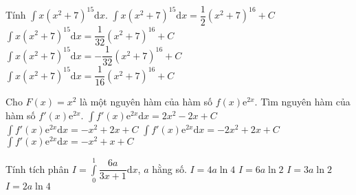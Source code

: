\begin{ex}%
	Tính $\displaystyle \int x(x^2+7)^{15} \mathrm{d}x$.
	\choice
	{$\displaystyle \int x(x^2+7)^{15} \mathrm{d}x=\dfrac{1}{2}{\left(x^2+7\right)}^{16}+C$}
	{\True $\displaystyle \int x(x^2+7)^{15} \mathrm{d}x=\dfrac{1}{32}{\left(x^2+7\right)}^{16}+C$}
	{$\displaystyle \int x(x^2+7)^{15} \mathrm{d}x=-\dfrac{1}{32}{\left(x^2+7\right)}^{16}+C$}
	{$\displaystyle \int x(x^2+7)^{15} \mathrm{d}x=\dfrac{1}{16}{\left(x^2+7\right)}^{16}+C$}
\end{ex}
\begin{ex}%
	Cho $F(x)=x^2$ là một nguyên hàm của hàm số $f(x)\mathrm{e}^{2x}$. Tìm nguyên hàm của hàm số $f'(x)\mathrm{e}^{2x}$.
	\choice
	{$\displaystyle \int f'(x)\mathrm{e}^{2x}\mathrm{d}x=2x^2-2x+C$}
{ $\displaystyle \int f'(x)\mathrm{e}^{2x}\mathrm{d}x=-x^2+2x+C$}
{\True $\displaystyle \int f'(x)\mathrm{e}^{2x}\mathrm{d}x=-2x^2+2x+C$}
{$\displaystyle \int f'(x)\mathrm{e}^{2x}\mathrm{d}x=-x^2+x+C$}
\end{ex}
\begin{ex}%
Tính tích phân $I=\displaystyle \int\limits_0^1 \dfrac{6a}{3x+1} \mathrm{d}x$, $a$ hằng số.
\choice
{$I=4a\ln 4$}
{$I=6a\ln 2$}
{$I=3a\ln 2$}
{\True $I=2a\ln 4$}
\end{ex}
